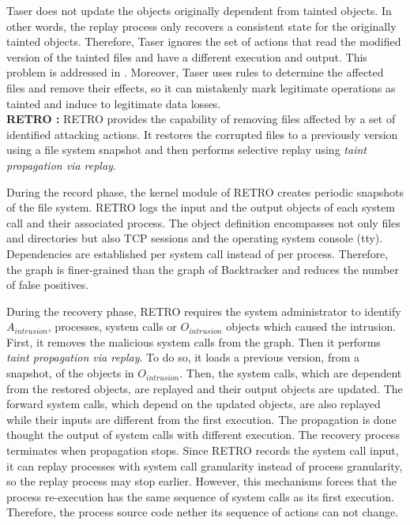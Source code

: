Taser does not update the objects originally dependent from tainted objects. In other words, the replay process only recovers a consistent state for the originally tainted objects. Therefore, Taser ignores the set of actions that read the modified version of the tainted files and have a different execution and output. This problem is addressed in \cite{Shafique2006}. Moreover, Taser uses rules to determine the affected files and remove their effects, so it can mistakenly mark legitimate operations as tainted and induce to legitimate data losses.\\



\textbf{RETRO \cite{retro}:} RETRO provides the capability of removing files affected by a set of identified attacking actions. It restores the corrupted files to a previously version using a file system snapshot and then performs selective replay using \textit{taint propagation via replay}. 

During the record phase, the kernel module of RETRO creates periodic snapshots of the file system. RETRO logs the input and the output objects of each system call and their associated process. The object definition encompasses not only files and directories but also \ac{TCP} sessions and the operating system console (tty). Dependencies are established per system call instead of per process. Therefore, the graph is finer-grained than the graph of Backtracker \cite{backtracker} and reduces the number of false positives.

During the recovery phase, RETRO requires the system administrator to identify $A_{intrusion}$, processes, system calls or $O_{intrusion}$ objects which caused the intrusion. First, it removes the malicious system calls from the graph. Then it performs \textit{taint propagation via replay}. To do so, it loads a previous version, from a snapshot, of the objects in $O_{intrusion}$. Then, the system calls, which are dependent from the restored objects, are replayed and their output objects are updated. The forward system calls, which depend on the updated objects, are also replayed while their inputs are different from the first execution. The propagation is done thought the output of system calls with different execution. The recovery process terminates when propagation stops. Since RETRO records the system call input, it can replay processes with system call granularity instead of process granularity, so the replay process may stop earlier. However, this mechanisms forces that the process re-execution has the same sequence of system calls as its first execution. Therefore, the process source code nether its sequence of actions can not change. 

